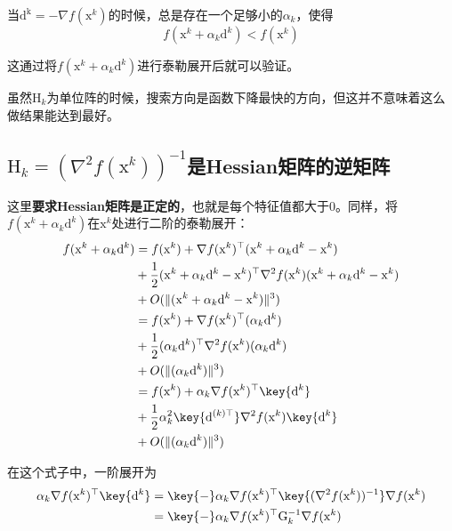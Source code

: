 \documentclass[a4paper]{D:/repositories/MyDGP/latex/PaperReadingLog}
\begin{document}
当$\mathrm{d^k}=-\nabla f(\mathrm{x}^k)$的时候，总是存在一个足够小的$\alpha_k$，使得
$$
f(\mathrm{x}^k+\alpha_k\mathrm{d}^k)<f(\mathrm{x}^k)
$$

这通过将$f(\mathrm{x}^k+\alpha_k\mathrm{d}^k)$进行泰勒展开后就可以验证。

虽然$\mathrm{H}_k$为单位阵的时候，搜索方向是函数下降最快的方向，但这并不意味着这么做结果能达到最好。


\subsection{$\mathrm{H}_k=(\nabla^2f(\mathrm{x}^k))^{-1}$是Hessian矩阵的逆矩阵}
这里\textbf{要求Hessian矩阵是正定的}，也就是每个特征值都大于0。同样，将$f(\mathrm{x}^k+\alpha_k\mathrm{d}^k)$在$\mathrm{x}^k$处进行二阶的泰勒展开：
$$
\begin{aligned}
    f(\mathrm{x}^k+\alpha_k\mathrm{d}^k)&=f(\mathrm{x}^k)+\nabla f(\mathrm{x}^k)^\top(\mathrm{x}^k+\alpha_k\mathrm{d}^k-\mathrm{x}^k)\\
    &+\frac{1}{2}(\mathrm{x}^k+\alpha_k\mathrm{d}^k-\mathrm{x}^k)^\top\nabla^2 f(\mathrm{x}^k)(\mathrm{x}^k+\alpha_k\mathrm{d}^k-\mathrm{x}^k)\\
    &+O(\lVert (\mathrm{x}^k+\alpha_k\mathrm{d}^k-\mathrm{x}^k) \lVert ^3)\\
    &= f(\mathrm{x}^k)+\nabla f(\mathrm{x}^k)^\top(\alpha_k\mathrm{d}^k)\\
    &+\frac{1}{2}(\alpha_k\mathrm{d}^k)^\top\nabla^2 f(\mathrm{x}^k)(\alpha_k\mathrm{d}^k)\\
    &+O(\lVert (\alpha_k\mathrm{d}^k) \lVert ^3)\\
    &= f(\mathrm{x}^k)+\alpha_k\nabla f(\mathrm{x}^k)^\top\key{\mathrm{d}^k}\\
    &+\frac{1}{2}\alpha_k^2\key{\mathrm{d}^{(k)\top}}\nabla^2 f(\mathrm{x}^k)\key{\mathrm{d}^k}\\
    &+O(\lVert (\alpha_k\mathrm{d}^k) \lVert ^3)\\
\end{aligned}
$$

在这个式子中，一阶展开为
$$
\begin{aligned}
    \alpha_k\nabla f(\mathrm{x}^k)^\top\key{\mathrm{d}^k}&=\key{-}\alpha_k\nabla f(\mathrm{x}^k)^\top\key{(\nabla^2f(\mathrm{x}^k))^{-1}}\nabla f(\mathrm{x}^k)\\
    &=\key{-}\alpha_k\nabla f(\mathrm{x}^k)^\top \mathrm{G}_k^{-1}\nabla f(\mathrm{x}^k)
\end{aligned}
$$
\end{document}
